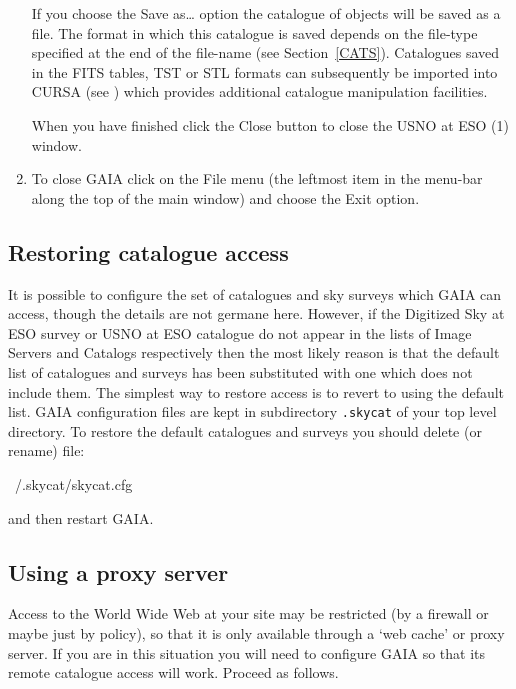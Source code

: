 \documentclass[twoside,11pt]{starlink}
\begin{document}
\begin{enumerate}
   If you choose the \textsf{Save as\ldots} option the catalogue of objects
   will be saved as a file.  The format in which this catalogue is saved
   depends on the    file-type specified at the end of the file-name (see
   Section~\ref{CATS}).  Catalogues saved in the FITS tables, TST or STL
   formats can subsequently be imported into CURSA (see
   \cite{SUN190}) which provides additional
   catalogue manipulation facilities.

   When you have finished click the \textsf{Close} button to close the \textsf{USNO at ESO (1)} window.

  \item To close GAIA click on the \textsf{File} menu (the leftmost item in
   the menu-bar along the top of the main window) and choose the \textsf{Exit} option.

\end{enumerate}

\subsection{\label{RESTORE_CONFIG}Restoring catalogue access}

It is possible to configure the set of catalogues and sky surveys which
GAIA can access, though the details are not germane here.  However, if
the \textsf{Digitized Sky at ESO} survey or \textsf{USNO at ESO} catalogue do
not appear in the lists of \textsf{Image Servers} and \textsf{Catalogs}
respectively then the most likely reason is that the default list of
catalogues and surveys has been substituted with one which does not
include them.  The simplest way to restore access is to revert to using
the default list.  GAIA configuration files are kept in subdirectory \texttt{.skycat} of your top level directory.  To restore the default catalogues
and surveys you should delete (or rename) file:

\begin{terminalv}
~/.skycat/skycat.cfg
\end{terminalv}

and then restart GAIA.

\subsection{Using a proxy server}

Access to the World Wide Web at your site may be restricted (by a firewall
or maybe just by policy), so that it is only available through a `web cache'
or proxy server.  If you are in this situation you will need to configure
GAIA so that its remote catalogue access will work.  Proceed as follows.
\end{document}
